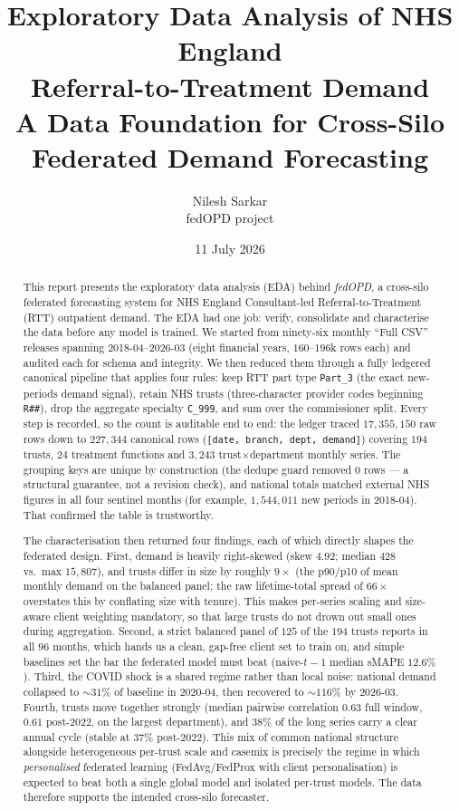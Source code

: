 \documentclass[11pt,a4paper]{article}
\title{\textbf{Exploratory Data Analysis of NHS England\\ Referral-to-Treatment Demand}\\[0.4em]
\large A Data Foundation for Cross-Silo Federated Demand Forecasting}
\author{Nilesh Sarkar \\ \small fedOPD project}
\date{11 July 2026}
\begin{document}
\maketitle

\begin{abstract}
This report presents the exploratory data analysis (EDA) behind \emph{fedOPD}, a cross-silo federated forecasting system for NHS England Consultant-led Referral-to-Treatment (RTT) outpatient demand. The EDA had one job: verify, consolidate and characterise the data before any model is trained. We started from ninety-six monthly ``Full CSV'' releases spanning 2018-04--2026-03 (eight financial years, $160$--$196$k rows each) and audited each for schema and integrity. We then reduced them through a fully ledgered canonical pipeline that applies four rules: keep RTT part type \texttt{Part\_3} (the exact new-periods demand signal), retain NHS trusts (three-character provider codes beginning \texttt{R\#\#}), drop the aggregate specialty \texttt{C\_999}, and sum over the commissioner split. Every step is recorded, so the count is auditable end to end: the ledger traced $17{,}355{,}150$ raw rows down to $227{,}344$ canonical rows (\texttt{[date, branch, dept, demand]}) covering $194$ trusts, $24$ treatment functions and $3{,}243$ trust$\times$department monthly series. The grouping keys are unique by construction (the dedupe guard removed $0$ rows --- a structural guarantee, not a revision check), and national totals matched external NHS figures in all four sentinel months (for example, $1{,}544{,}011$ new periods in 2018-04). That confirmed the table is trustworthy.

The characterisation then returned four findings, each of which directly shapes the federated design. First, demand is heavily right-skewed (skew $4.92$; median $428$ vs.\ max $15{,}807$), and trusts differ in size by roughly $9\times$ (the p90/p10 of mean monthly demand on the balanced panel; the raw lifetime-total spread of $66\times$ overstates this by conflating size with tenure). This makes per-series scaling and size-aware client weighting mandatory, so that large trusts do not drown out small ones during aggregation. Second, a strict balanced panel of $125$ of the $194$ trusts reports in all $96$ months, which hands us a clean, gap-free client set to train on, and simple baselines set the bar the federated model must beat (naive-$t-1$ median sMAPE $12.6\%$). Third, the COVID shock is a shared regime rather than local noise: national demand collapsed to $\sim$$31\%$ of baseline in 2020-04, then recovered to $\sim$$116\%$ by 2026-03. Fourth, trusts move together strongly (median pairwise correlation $0.63$ full window, $0.61$ post-2022, on the largest department), and $38\%$ of the long series carry a clear annual cycle (stable at $37\%$ post-2022). This mix of common national structure alongside heterogeneous per-trust scale and casemix is precisely the regime in which \emph{personalised} federated learning (FedAvg/FedProx with client personalisation) is expected to beat both a single global model and isolated per-trust models. The data therefore supports the intended cross-silo forecaster.
\end{abstract}
\end{document}
